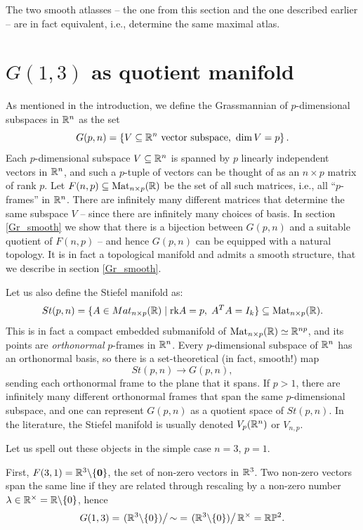\documentclass[11pt,a4paper]{report}
\begin{document}
The two smooth atlasses  -- the one from this section and the one described earlier -- are in fact equivalent, i.e., determine the
same maximal atlas.



\section{$G(1,3)$ as quotient manifold} 

As mentioned in the introduction, we define the Grassmannian of $p$-dimensional subspaces in $\mathbb{R}^n$ as the set
\[
	G(p,n)= \left\{V\subseteq \mathbb{R}^n \textrm{ vector subspace, }\dim V=p \right\}.
\]
Each $p$-dimensional subspace $V\subseteq \mathbb{R}^n$ is spanned by $p$ linearly independent vectors in $\mathbb{R}^n$, and such  a
$p$-tuple of vectors can be thought of as an $n\times p$ matrix of rank $p$.
Let $F(n,p)\subseteq \textrm{Mat}_{n\times p}(\mathbb{R})$ be the set of all such matrices, i.e., all ``$p$-frames'' in $\mathbb{R}^n$. There
are infinitely many different matrices that determine the same subspace $V$ -- since there are infinitely many choices of basis.
In section \ref{Gr_smooth} we show that there is a bijection between $G(p,n)$ and a suitable quotient of $F(n,p)$ -- and hence 
$G(p,n)$ can be equipped with a natural topology. It is in fact  a topological manifold and admits a smooth structure, that we describe in
section \ref{Gr_smooth}.





Let us also  define the  Stiefel manifold as:
\begin{equation}
St(p,n) = \{ A \in Mat_{n \times p}(\mathbb{R}) \; | \; \textrm{rk} A = p, \; A^T A = I_k \}\subseteq \textrm{Mat}_{n\times p}(\mathbb{R}).
\end{equation}
%
This is in fact a compact embedded submanifold of $\textrm{Mat}_{n\times p}(\mathbb{R})\simeq \mathbb{R}^{np}$, and its points are
\emph{orthonormal} $p$-frames in $\mathbb{R}^n$. Every $p$-dimensional subspace of $\mathbb{R}^n$ has an orthonormal basis,
so there is a set-theoretical (in fact, smooth!) map
\[
	St(p,n) \longrightarrow G(p,n),
\]
sending each orthonormal frame to the plane that it spans. If $p>1$, 
%
there are infinitely many different orthonormal frames that span the same $p$-dimensional subspace,
and one can represent $G(p,n)$ as a quotient space of $St(p,n)$.
%
In the literature, the Stiefel manifold is usually
denoted $V_p(\mathbb{R}^n)$ or $V_{n,p}$.

Let us spell out these objects in the simple case $n=3$, $p=1$.

      First, $F(3,1)=\mathbb{R}^3\backslash\{\mathbf{0}\}$, the set of non-zero vectors in $\mathbb{R}^3$. Two non-zero vectors  span the
      same line if they are related through rescaling by a non-zero number $\lambda\in \mathbb{R}^\times=\mathbb{R}\backslash\{0\}$, hence
      \[
      	G(1,3)= \left. (\mathbb{R}^3\backslash\{0\})\right/{\sim}=  \left. (\mathbb{R}^3\backslash\{0\})\right/\mathbb{R}^\times = \mathbb{R}\mathbb{P}^2.
      \]
      
\end{document}
